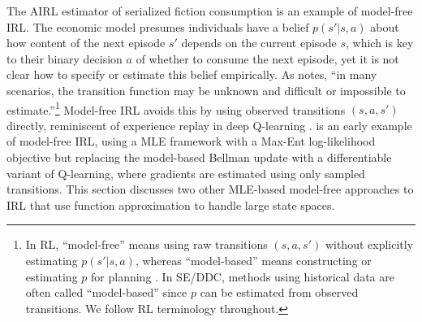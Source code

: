 The AIRL estimator of serialized fiction consumption is an example of model-free IRL. The economic model presumes individuals have 
a belief $p(s'|s,a)$ about how content of the next episode $s'$ depends on the current episode $s$, which is key to their binary decision $a$
of whether to consume the next episode, yet it is not clear how to specify or estimate this belief empirically.
As \citet{adams:2022} notes, ``in many scenarios, the transition function may be unknown and difficult or impossible to estimate.''\footnote{\footnotesize In RL, ``model-free'' means using raw transitions $(s,a,s')$ without explicitly estimating $p(s'|s,a)$, whereas ``model-based'' means constructing or estimating $p$ for planning \citep{BartoSutton:2020}. In SE/DDC, methods using historical data are often called ``model-based'' since $p$ can be estimated from observed transitions. We follow RL terminology throughout.} Model-free IRL avoids this by using observed transitions $(s,a,s')$ directly, reminiscent of experience replay in deep Q-learning \citep{mnih:2015}. \citet{jain:2019} is an early example of model-free IRL, using a  MLE framework with a Max-Ent 
log-likelihood objective but replacing the model-based Bellman update with a differentiable variant of Q-learning, where
gradients are estimated using only sampled transitions. This section discusses two other MLE-based model-free approaches to IRL that
use function approximation to handle large state spaces.

